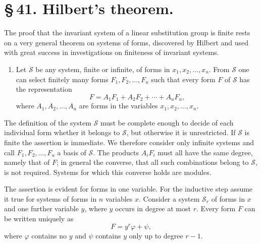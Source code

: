 \documentclass[11pt]{article}
\begin{document}
\section*{\S\,41. Hilbert's theorem.}

The proof that the invariant system of a linear substitution group is finite rests on a very general theorem on systems of forms, discovered by Hilbert and used with great success in investigations on finiteness of invariant systems.

\begin{enumerate}[label=\Roman*.,leftmargin=2.4em]
\item Let $\mathcal S$ be any system, finite or infinite, of forms in $x_1,x_2,\ldots,x_n$. From $\mathcal S$ one can select finitely many forms $F_1,F_2,\ldots,F_u$ such that every form $F$ of $\mathcal S$ has the representation
\begin{equation}
F=A_1F_1+A_2F_2+\cdots+A_uF_u,
\tag{1}
\end{equation}
where $A_1,A_2,\ldots,A_u$ are forms in the variables $x_1,x_2,\ldots,x_n$.
\end{enumerate}

The definition of the system $\mathcal S$ must be complete enough to decide of each individual form whether it belongs to $\mathcal S$, but otherwise it is unrestricted. If $\mathcal S$ is finite the assertion is immediate. We therefore consider only infinite systems and call $F_1,F_2,\ldots,F_u$ a basis of $\mathcal S$. The products $A_iF_i$ must all have the same degree, namely that of $F$; in general the converse, that all such combinations belong to $\mathcal S$, is not required. Systems for which this converse holds are modules.

The assertion is evident for forms in one variable. For the inductive step assume it true for systems of forms in $n$ variables $x$. Consider a system $\mathcal S_r$ of forms in $x$ and one further variable $y$, where $y$ occurs in degree at most $r$. Every form $F$ can be written uniquely as
\begin{equation}
F=y^r\varphi+\psi,
\tag{2}
\end{equation}
where $\varphi$ contains no $y$ and $\psi$ contains $y$ only up to degree $r-1$.
\end{document}
